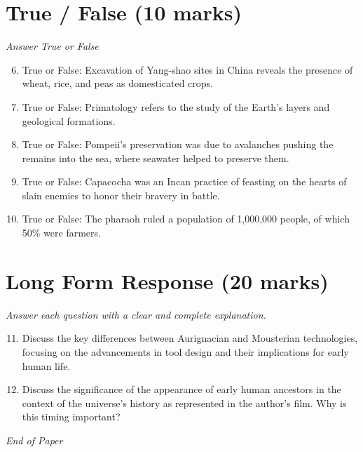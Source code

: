 \documentclass[12pt]{article}
\begin{document}
\section*{True / False (10 marks)}
\textit{Answer True or False}
\begin{enumerate}[label=\arabic*.]
\setcounter{enumi}{5}
\item True or False: Excavation of Yang-shao sites in China reveals the presence of wheat, rice, and peas as domesticated crops.
\item True or False: Primatology refers to the study of the Earth's layers and geological formations.
\item True or False: Pompeii's preservation was due to avalanches pushing the remains into the sea, where seawater helped to preserve them.
\item True or False: Capacocha was an Incan practice of feasting on the hearts of slain enemies to honor their bravery in battle.
\item True or False: The pharaoh ruled a population of 1,000,000 people, of which 50\% were farmers.
\end{enumerate}

\section*{Long Form Response (20 marks)}
\textit{Answer each question with a clear and complete explanation.}
\begin{enumerate}[label=\arabic*.]
\setcounter{enumi}{10}
\item Discuss the key differences between Aurignacian and Mousterian technologies, focusing on the advancements in tool design and their implications for early human life.
\item Discuss the significance of the appearance of early human ancestors in the context of the universe's history as represented in the author's film. Why is this timing important?
\end{enumerate}

\vfill
\noindent\textit{End of Paper}
\end{document}
